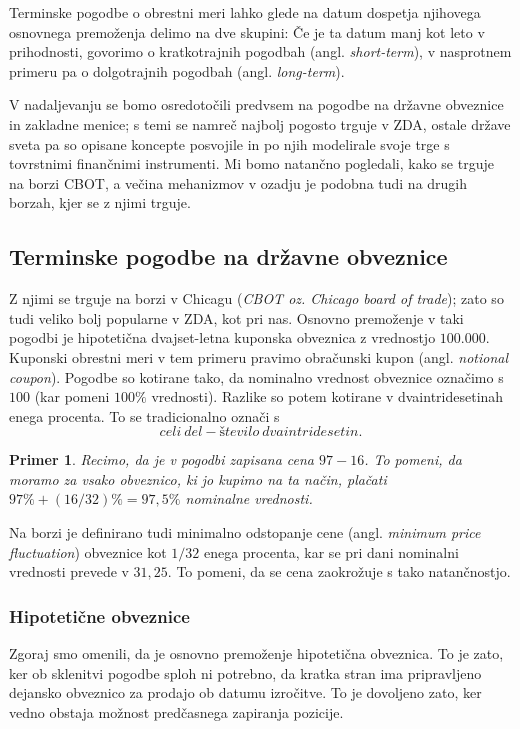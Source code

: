 \documentclass[a4paper, 11pt]{article}
\newtheorem{primer}{Primer}
\begin{document}
Terminske pogodbe o obrestni meri lahko glede na datum dospetja njihovega osnovnega premoženja delimo na 
dve skupini: Če je ta datum manj kot leto v prihodnosti, govorimo o kratkotrajnih pogodbah (angl. 
\textit{short-term}), v nasprotnem primeru pa o dolgotrajnih pogodbah (angl. \textit{long-term}). 

V nadaljevanju se bomo osredotočili predvsem na pogodbe na državne obveznice in zakladne menice; s temi
se namreč najbolj pogosto trguje v ZDA, ostale države sveta pa so opisane koncepte posvojile in po njih
modelirale svoje trge s tovrstnimi finančnimi instrumenti. Mi bomo natančno pogledali, kako se trguje na
borzi CBOT, a večina mehanizmov v ozadju je podobna tudi na drugih borzah, kjer se z njimi trguje.

\subsection{Terminske pogodbe na državne obveznice}
Z njimi se trguje na borzi v Chicagu (\textit{CBOT oz. Chicago board of trade}); zato so tudi veliko 
bolj popularne v ZDA, kot pri nas. Osnovno premoženje v taki pogodbi je hipotetična dvajset-letna 
kuponska obveznica z vrednostjo \textdollar$100.000$. Kuponski obrestni meri v tem primeru pravimo 
obračunski kupon (angl. \textit{notional coupon}). Pogodbe so kotirane tako, da nominalno vrednost 
obveznice označimo s $100$ (kar pomeni $100\%$ vrednosti). Razlike so potem kotirane v dvaintridesetinah 
enega procenta. To se tradicionalno označi s 
%
$$ celi\:del - število\:dvaintridesetin. $$
%

\begin{primer}
    Recimo, da je v pogodbi zapisana cena $97-16$. To pomeni, da moramo za vsako obveznico, ki jo kupimo 
    na ta način, plačati $97\% + (16/32)\% = 97,5\%$ nominalne vrednosti. 
\end{primer}

Na borzi je definirano tudi minimalno odstopanje cene (angl. \textit{minimum price fluctuation}) obveznice
kot $1/32$ enega procenta, kar se pri dani nominalni vrednosti prevede v \textdollar$31,25.$ To pomeni, da
se cena zaokrožuje s tako natančnostjo.

\subsubsection{Hipotetične obveznice}
Zgoraj smo omenili, da je osnovno premoženje hipotetična obveznica. To je zato, ker ob sklenitvi pogodbe 
sploh ni potrebno, da kratka stran ima pripravljeno dejansko obveznico za prodajo ob datumu izročitve.
To je dovoljeno zato, ker vedno obstaja možnost predčasnega zapiranja pozicije. 
\end{document}
